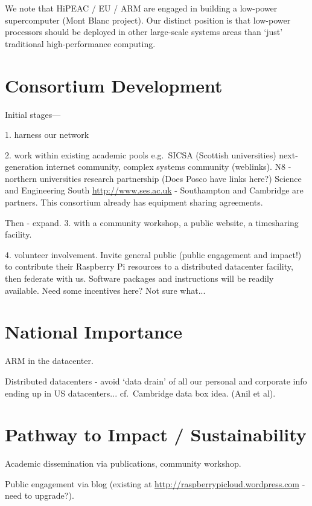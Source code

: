\documentclass[a4paper,11pt]{article}
\begin{document}
We note that HiPEAC / EU / ARM are engaged in building a low-power supercomputer (Mont Blanc project). Our distinct position is that low-power processors should be deployed in other large-scale systems areas than `just' traditional high-performance computing.



\section{Consortium Development}

Initial stages---

1. harness our network

2. 
work within existing academic pools e.g.\ SICSA (Scottish universities) next-generation internet community, complex systems community (weblinks).
N8 - northern universities research partnership (Does Posco have links here?)
Science and Engineering South \url{http://www.ses.ac.uk} - Southampton and Cambridge are partners. This consortium already has equipment sharing agreements.

Then - expand.
3. with a community workshop, a public website, a timesharing facility.

4. volunteer involvement. Invite general public (public engagement and impact!) to contribute their Raspberry Pi resources to a distributed datacenter facility, then federate with us. Software packages and instructions will be readily available. Need some incentives here? Not sure what...



\section{National Importance}

ARM in the datacenter.

Distributed datacenters - avoid `data drain' of all our personal and corporate info ending up in US datacenters... cf.\ Cambridge data box idea. (Anil et al).

\section{Pathway to Impact / Sustainability}

Academic dissemination via publications, community workshop.

Public engagement via blog (existing at \url{http://raspberrypicloud.wordpress.com} - need to upgrade?).
\end{document}
